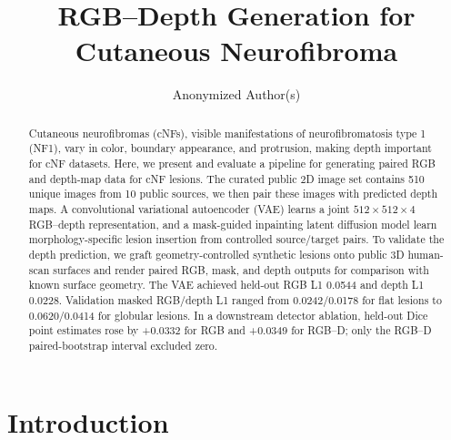 \documentclass[runningheads]{llncs}
\begin{document}
\title{RGB--Depth Generation for Cutaneous Neurofibroma}

\author{Anonymized Author(s)}

\maketitle

\begin{abstract}
Cutaneous neurofibromas (cNFs), visible manifestations of neurofibromatosis type 1 (NF1), vary in color, boundary appearance, and protrusion, making depth important for cNF datasets. Here, we present and evaluate a pipeline for generating paired RGB and depth-map data for cNF lesions. The curated public 2D image set contains 510 unique images from 10 public sources, we then pair these images with predicted depth maps. A convolutional variational autoencoder (VAE) learns a joint $512 \times 512 \times 4$ RGB--depth representation, and a mask-guided inpainting latent diffusion model learn morphology-specific lesion insertion from controlled source/target pairs. To validate the depth prediction, we graft geometry-controlled synthetic lesions onto public 3D human-scan surfaces and render paired RGB, mask, and depth outputs for comparison with known surface geometry. The VAE achieved held-out RGB L1 0.0544 and depth L1 0.0228. Validation masked RGB/depth L1 ranged from 0.0242/0.0178 for flat lesions to 0.0620/0.0414 for globular lesions. In a downstream detector ablation, held-out Dice point estimates rose by +0.0332 for RGB and +0.0349 for RGB--D; only the RGB--D paired-bootstrap interval excluded zero.

\end{abstract}

\section{Introduction}
\end{document}
